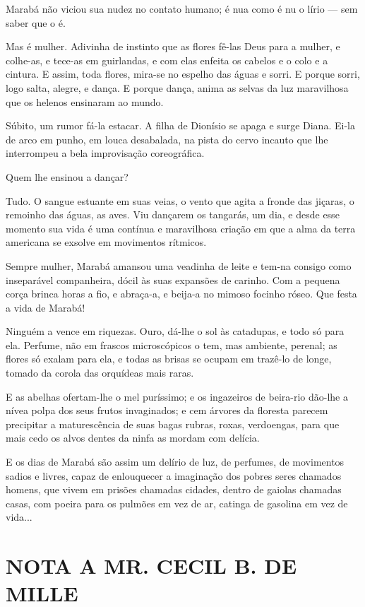 Marabá não viciou sua nudez no contato humano; é nua como é nu o lírio
--- sem saber que o é.

Mas é mulher. Adivinha de instinto que as flores fê-las Deus para a
mulher, e colhe-as, e tece-as em guirlandas, e com elas enfeita os
cabelos e o colo e a cintura. E assim, toda flores, mira-se no espelho
das águas e sorri. E porque sorri, logo salta, alegre, e dança. E porque
dança, anima as selvas da luz maravilhosa que os helenos ensinaram ao
mundo.

Súbito, um rumor fá-la estacar. A filha de Dionísio se apaga e surge
Diana. Ei-la de arco em punho, em louca desabalada, na pista do cervo
incauto que lhe interrompeu a bela improvisação coreográfica.

Quem lhe ensinou a dançar?

Tudo. O sangue estuante em suas veias, o vento que agita a fronde das
jiçaras, o remoinho das águas, as aves. Viu dançarem os tangarás, um
dia, e desde esse momento sua vida é uma contínua e maravilhosa criação
em que a alma da terra americana se exsolve em movimentos rítmicos.

Sempre mulher, Marabá amansou uma veadinha de leite e tem-na consigo
como inseparável companheira, dócil às suas expansões de carinho. Com a
pequena corça brinca horas a fio, e abraça-a, e beija-a no mimoso
focinho róseo. Que festa a vida de Marabá!

Ninguém a vence em riquezas. Ouro, dá-lhe o sol às catadupas, e todo só
para ela. Perfume, não em frascos microscópicos o tem, mas ambiente,
perenal; as flores só exalam para ela, e todas as brisas se ocupam em
trazê-lo de longe, tomado da corola das orquídeas mais raras.

E as abelhas ofertam-lhe o mel puríssimo; e os ingazeiros de beira-rio
dão-lhe a nívea polpa dos seus frutos invaginados; e cem árvores da
floresta parecem precipitar a maturescência de suas bagas rubras, roxas,
verdoengas, para que mais cedo os alvos dentes da ninfa as mordam com
delícia.

E os dias de Marabá são assim um delírio de luz, de perfumes, de
movimentos sadios e livres, capaz de enlouquecer a imaginação dos pobres
seres chamados homens, que vivem em prisões chamadas cidades, dentro de
gaiolas chamadas casas, com poeira para os pulmões em vez de ar, catinga
de gasolina em vez de vida...

\section{NOTA A MR. CECIL B. DE MILLE}

